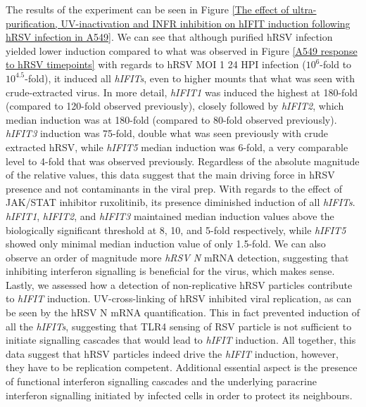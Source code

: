 The results of the experiment can be seen in Figure \ref{The effect of ultra-purification, UV-inactivation and INFR inhibition on hIFIT induction following hRSV infection in A549}. We can see that although purified hRSV infection yielded lower induction compared to what was observed in Figure \ref{A549 response to hRSV timepoints} with regards to hRSV MOI 1 24 HPI infection (\(10^6\)-fold to \(10^{4.5}\)-fold), it induced all \textit{hIFITs}, even to higher mounts that what was seen with crude-extracted virus. In more detail, \textit{hIFIT1} was induced the highest at 180-fold (compared to 120-fold observed previously), closely followed by \textit{hIFIT2}, which median induction was at 180-fold (compared to 80-fold observed previously). \textit{hIFIT3} induction was 75-fold, double what was seen previously with crude extracted hRSV, while \textit{hIFIT5} median induction was 6-fold, a very comparable level to 4-fold that was observed previously. Regardless of the absolute magnitude of the relative values, this data suggest that the main driving force in hRSV presence and not contaminants in the viral prep. With regards to the effect of JAK/STAT inhibitor ruxolitinib, its presence diminished induction of all \textit{hIFITs}. \textit{hIFIT1}, \textit{hIFIT2}, and \textit{hIFIT3} maintained median induction values above the biologically significant threshold at 8, 10, and 5-fold respectively, while \textit{hIFIT5} showed only minimal median induction value of only 1.5-fold. We can also observe an order of magnitude more \textit{hRSV N} mRNA detection, suggesting that inhibiting interferon signalling is beneficial for the virus, which makes sense. Lastly, we assessed how a detection of non-replicative hRSV particles contribute to \textit{hIFIT} induction. UV-cross-linking of hRSV inhibited viral replication, as can be seen by the {hRSV N} mRNA quantification. This in fact prevented induction of all the \textit{hIFITs}, suggesting that TLR4 sensing of RSV particle is not sufficient to initiate signalling cascades that would lead to \textit{hIFIT} induction. All together, this data suggest that hRSV particles indeed drive the \textit{hIFIT} induction, however, they have to be replication competent. Additional essential aspect is the presence of functional interferon signalling cascades and the underlying paracrine interferon signalling initiated by infected cells in order to protect its neighbours.

